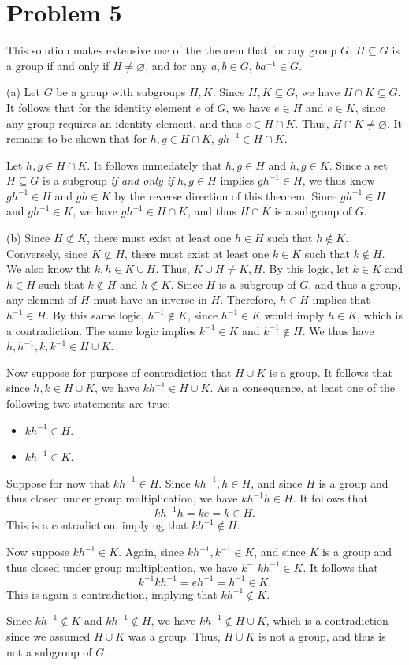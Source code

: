 \documentclass[11pt, letterpaper]{report}
\renewenvironment{solution}[1][]{\begin{setsolution}}{\end{setsolution}}
\begin{document}
\section*{Problem 5}
This solution makes extensive use of the theorem that for any group $G$, $H\subseteq G$ is a group if and only if $H\neq \varnothing$, and for any $a,b\in G$, $ba^{-1}\in G$.
\begin{solution}
	(a) Let $G$ be a group with subgroups $H,K$. Since $H,K\subseteq G$, we have $H\cap K\subseteq G$. It follows that for the identity element $e$ of $G$, we have $e\in H$ and $e\in K$, since any group requires an identity element, and thus $e\in H\cap K$. Thus, $H\cap K\neq \varnothing$. It remains to be shown that for $h,g\in H\cap K$, $gh^{-1}\in H\cap K$.

	Let $h,g\in H\cap K$. It follows immedately that $h,g\in H$ and $h,g\in K$. Since a set $H\subseteq G$ is a subgroup \emph{if and only if} $h,g\in H$ implies $gh^{-1}\in H$, we thus know $gh^{-1}\in H$ and $gh\in K$ by the reverse direction of this theorem. Since $gh^{-1}\in H$ and $gh^{-1}\in K$, we have $gh^{-1}\in H\cap K$, and thus $H\cap K$ is a subgroup of $G$.

	(b) Since $H \not\subset K$, there must exist at least one $h\in H$ such that $h\notin K$. Conversely, since $K\not\subset H$, there must exist at least one $k\in K$ such that $k\notin H$. We also know tht $k,h\in K\cup H$. Thus, $K\cup H \neq K,H$. By this logic, let $k\in K$ and $h\in H$ such that $k\notin H$ and $h\notin K$. Since $H$ is a subgroup of $G$, and thus a group, any element of $H$ must have an inverse in $H$. Therefore, $h\in H$ implies that $h^{-1}\in H$. By this same logic, $h^{-1}\notin K$, since $h^{-1}\in K$ would imply $h\in K$, which is a contradiction. The same logic implies $k^{-1}\in K$ and $k^{-1}\notin H$. We thus have $h,h^{-1},k,k^{-1}\in H\cup K$.

	Now suppose for purpose of contradiction that $H\cup K$ is a group. It follows that since $h,k\in H\cup K$, we have $kh^{-1}\in H\cup K$. As a consequence, at least one of the following two statements are true:
	\begin{itemize}
		\item $kh^{-1}\in H$.
		\item $kh^{-1}\in K$.
	\end{itemize}
	Suppose for now that $kh^{-1}\in H$. Since $kh^{-1},h\in H$, and since $H$ is a group and thus closed under group multiplication, we have $kh^{-1}h\in H$. It follows that
	\[
		kh^{-1}h=ke=k\in H
	.\]
	This is a contradiction, implying that $kh^{-1}\notin H$.

	Now suppose $kh^{-1}\in K$. Again, since $kh^{-1},k^{-1}\in K$, and since $K$ is a group and thus closed under group multiplication, we have $k^{-1}kh^{-1}\in K$. It follows that
	\[
		k^{-1}kh^{-1}=eh^{-1}=h^{-1}\in K
	.\]
	This is again a contradiction, implying that $kh^{-1}\notin K$.

	Since  $kh^{-1}\notin K$ and $kh^{-1}\notin H$, we have $kh^{-1}\notin H\cup K$, which is a contradiction since we assumed $H\cup K$ was a group. Thus, $H\cup K$ is not a group, and thus is not a subgroup of $G$.
\end{solution}
\end{document}
